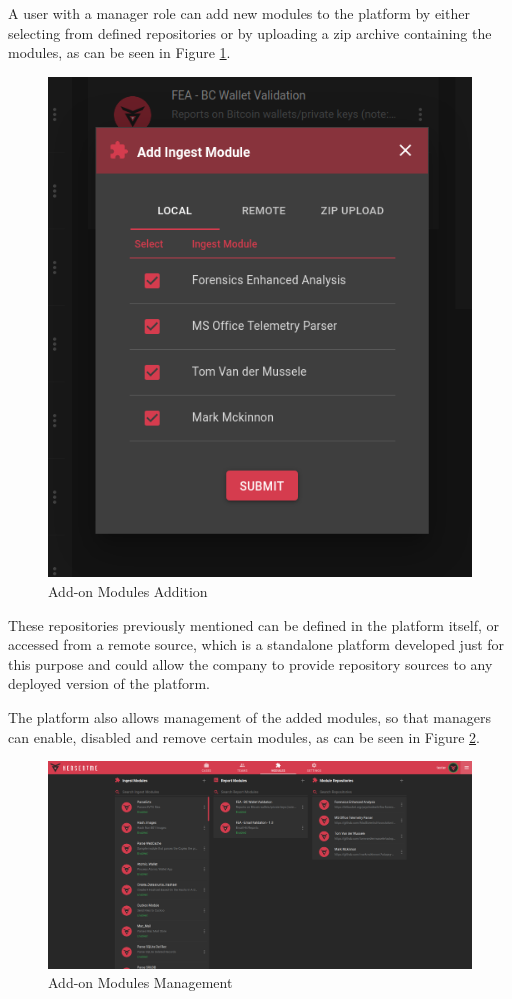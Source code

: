 A user with a manager role can add new modules to the platform by either selecting from defined repositories or by uploading a zip archive containing the modules, as can be seen in Figure \ref{fig:addmodule}.

\begin{figure}[ht]
 \centering
 \includegraphics[width=0.55\linewidth]{imgs/addmodule.png}
 \caption{Add-on Modules Addition}
 \label{fig:addmodule}
\end{figure}

These repositories previously mentioned can be defined in the platform itself, or accessed from a remote source, which is a standalone platform developed just for this purpose and could allow the company to provide repository sources to any deployed version of the platform.

The platform also allows management of the added modules, so that managers can enable, disabled and remove certain modules, as can be seen in Figure \ref{fig:modulesettings}.

\begin{figure}[ht]
 \centering
 \includegraphics[width=1\linewidth]{imgs/modulesettings.png}
 \caption{Add-on Modules Management}
 \label{fig:modulesettings}
\end{figure}

